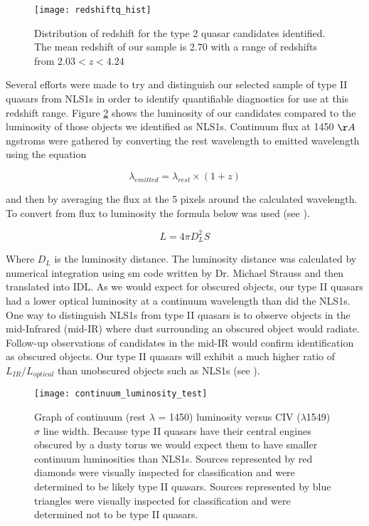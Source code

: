 \documentclass[preprint]{aastex}
\begin{document}
\begin{figure}
\begin{center}
\texttt{[image: redshiftq\_hist]}
\end{center}
\caption{Distribution of redshift for the type 2 quasar candidates identified.  The mean redshift of our sample is 2.70 with a range of redshifts from $2.03 < z < 4.24$}
\label{fig:redshiftq_hist}
\end{figure}

Several efforts were made to try and distinguish our selected sample of type II quasars from NLS1s in order to identify quantifiable diagnostics for use at this redshift range.  Figure \ref{fig:continuum_luminosity} shows the luminosity of our candidates compared to the luminosity of those objects we identified as NLS1s.  Continuum flux at 1450 $\AA$ngstroms were gathered by converting the rest wavelength to emitted wavelength using the equation  

\begin{equation}
\lambda_{emitted} = \lambda_{rest} \times (1+z)
\label{eq:lambda}
\end{equation}

and then by averaging the flux at the 5 pixels around the calculated wavelength.  To convert from flux to luminosity the formula below was used (see \cite{1999astro.ph..5116H}).

\begin{equation}
L = 4\pi D_L^2 S
\end{equation}

Where $D_L$ is the luminosity distance.  The luminosity distance was calculated by numerical integration using sm code written by Dr. Michael Strauss and then translated into IDL.  As we would expect for obscured objects, our type II quasars had a lower optical luminosity at a continuum wavelength than did the NLS1s.  One way to distinguish NLS1s from type II quasars is to observe objects in the mid-Infrared (mid-IR) where dust surrounding an obscured object would radiate.  Follow-up observations of candidates in the mid-IR would confirm identification as obscured objects.  Our type II quasars will exhibit a much higher ratio of $L_{IR}/L_{optical}$ than unobscured objects such as NLS1s (see \cite{2004AJ....128.1002Z}).

\begin{figure}
\begin{center}
\texttt{[image: continuum\_luminosity\_test]}
\end{center}
\caption{Graph of continuum (rest $\lambda$ = 1450) luminosity versus CIV ($\lambda$1549) $\sigma$ line width.   Because type II quasars have their central engines obscured by a dusty torus we would expect them to have smaller continuum luminosities than NLS1s.  Sources represented by red diamonds were visually inspected for classification and were determined to be likely type II quasars.  Sources represented by blue triangles were visually inspected for classification and were determined not to be type II quasars.}
\label{fig:continuum_luminosity}
\end{figure}
\end{document}
